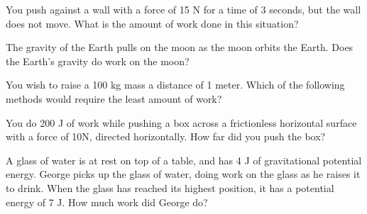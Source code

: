 \documentclass[10pt]{examdesign}
\begin{document}
\begin{multiplechoice} [title={Multiple Choice},
	rearrange=no]


	
	\begin{question}
You push against a wall with a force of 15 N for a time of 3 seconds, but the wall does not move.  What is the amount of work done in this situation?
	\end{question}



\begin{question}
The gravity of the Earth pulls on the moon as the moon orbits the Earth.  Does the Earth's gravity do work on the moon? 
\end{question}


\begin{question}
You wish to raise a 100 kg mass a distance of 1 meter.  Which of the following methods would require the least amount of work?
\end{question}

\begin{question}
You do 200 J of work while pushing a box across a frictionless horizontal surface with a force of 10N, directed horizontally.  How far did you push the box?
\end{question}

\begin{question}
	A glass of water is at rest on top of a table, and has 4 J of gravitational potential energy.  George picks up the glass of water, doing work on the glass as he raises it to drink.  When the glass has reached its highest position, it has a potential energy of 7 J.  How much work did George do?
\end{question}



\end{multiplechoice} 
\end{document}
